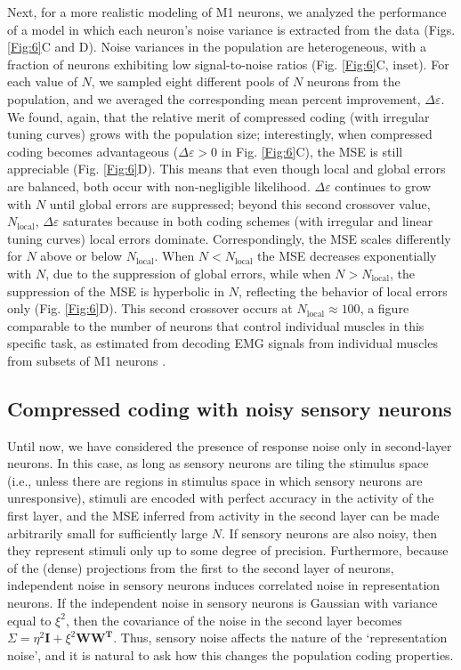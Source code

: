 \documentclass[a4paper]{article}%
\begin{document}
Next, for a more realistic modeling of M1 neurons, we analyzed the performance
of a model in which each neuron's noise variance is extracted from the data
(Figs. \ref{Fig:6}C and D). Noise variances in the population are
heterogeneous, with a fraction of neurons exhibiting low signal-to-noise
ratios (Fig. \ref{Fig:6}C, inset). For each value of $N$, we sampled eight
different pools of $N$ neurons from the population, and we averaged the
corresponding mean percent improvement, $\Delta\varepsilon$. We found, again,
that the relative merit of compressed coding (with irregular tuning curves)
grows with the population size; interestingly, when compressed coding becomes
advantageous ($\Delta\varepsilon>0$ in Fig. \ref{Fig:6}C), the MSE is still
appreciable (Fig. \ref{Fig:6}D). This means that even though local and global
errors are balanced, both occur with non-negligible likelihood. $\Delta
\varepsilon$ continues to grow with $N$ until global errors are suppressed;
beyond this second crossover value, $N_{\text{local}}$, $\Delta\varepsilon$
saturates because in both coding schemes (with irregular and linear tuning
curves) local errors dominate. Correspondingly, the MSE scales differently for
$N$ above or below $N_{\text{local}}$. When $N<N_{\text{local}}$ the MSE
decreases exponentially with $N$, due to the suppression of global errors,
while when $N>N_{\text{local}}$, the suppression of the MSE is hyperbolic in
$N$, reflecting the behavior of local errors only (Fig. \ref{Fig:6}D). This
second crossover occurs at $N_{\text{local}}\approx100$, a figure comparable
to the number of neurons that control individual muscles in this specific
task, as estimated from decoding EMG signals from individual muscles from
subsets of M1 neurons \cite{Lalazar2016TuningConnectivity}.

\subsection*{Compressed coding with noisy sensory neurons}

\label{SuSe:In}

Until now, we have considered the presence of response noise only in
second-layer neurons. In this case, as long as sensory neurons are tiling the
stimulus space (i.e., unless there are regions in stimulus space in which
sensory neurons are unresponsive), stimuli are encoded with perfect accuracy
in the activity of the first layer, and the MSE inferred from activity in the
second layer can be made arbitrarily small for sufficiently large
\thinspace$N$. If sensory neurons are also noisy, then they represent stimuli
only up to some degree of precision. Furthermore, because of the (dense)
projections from the first to the second layer of neurons, independent noise
in sensory neurons induces correlated noise in representation neurons. If the
independent noise in sensory neurons is Gaussian with variance equal to
$\xi^{2}$, then the covariance of the noise in the second layer becomes
$\Sigma=\eta^{2}\mathbf{I}+\xi^{2}\mathbf{WW^{T}}$. Thus, sensory noise
affects the nature of the `representation noise', and it is natural to ask how
this changes the population coding properties.
\end{document}
